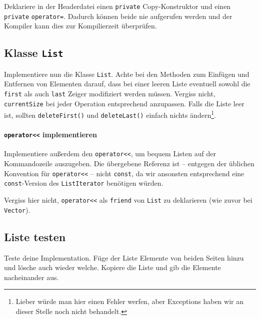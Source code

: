 Deklariere in der Headerdatei einen \lstinline{private} Copy-Konstruktor und einen \lstinline{private} \lstinline{operator=}.
Dadurch können beide nie aufgerufen werden und der Kompiler kann dies zur Kompilierzeit überprüfen.




\subsection{Klasse \lstinline{List}}
Implementiere nun die Klasse \lstinline{List}.
Achte bei den Methoden zum Einfügen und Entfernen von Elementen darauf, dass bei einer leeren Liste eventuell sowohl die \lstinline{first} als auch \lstinline{last} Zeiger modifiziert werden müssen.
Vergiss nicht, \lstinline{currentSize} bei jeder Operation entsprechend anzupassen.
Falls die Liste leer ist, sollten \lstinline{deleteFirst()} und \lstinline{deleteLast()} einfach nichts ändern\footnote{Lieber würde man hier einen Fehler werfen, aber Exceptions haben wir an dieser Stelle noch nicht behandelt.}.

\paragraph{\lstinline{operator<<} implementieren}
Implementiere außerdem den \lstinline{operator<<}, um bequem Listen auf der Kommandozeile auszugeben.
Die übergebene Referenz ist -- entgegen der üblichen Konvention für \lstinline{operator<<} -- nicht \lstinline{const}, da wir ansonsten entsprechend eine \lstinline{const}-Version des  \lstinline{ListIterator} benötigen würden.

Vergiss hier nicht, \lstinline{operator<<} als \lstinline{friend} von \lstinline{List} zu deklarieren (wie zuvor bei \lstinline{Vector}).



\subsection{Liste testen}
Teste deine Implementation.
Füge der Liste Elemente von beiden Seiten hinzu und lösche auch wieder welche.
Kopiere die Liste und gib die Elemente nacheinander aus.

